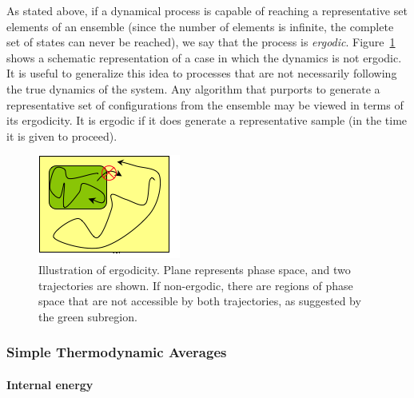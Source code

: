 \documentclass[]{article}
\let\oldparagraph\paragraph
\renewcommand{\paragraph}[1]{\oldparagraph{#1}\mbox{}}
\begin{document}
As stated above, if a dynamical process is capable of reaching a
representative set elements of an ensemble (since the number of elements
is infinite, the complete set of states can never be reached), we say
that the process is \emph{ergodic}. Figure~\ref{fig:ergodicity} shows a schematic
representation of a case in which the dynamics is not ergodic. It is
useful to generalize this idea to processes that are not necessarily
following the true dynamics of the system. Any algorithm that purports
to generate a representative set of configurations from the ensemble may
be viewed in terms of its ergodicity. It is ergodic if it does generate a
representative sample (in the time it is given to proceed).

\begin{figure}
\includegraphics[width=\textwidth]{StatMech_figures/image036}
\caption{\label{fig:ergodicity}Illustration of ergodicity. Plane represents phase space, and two trajectories are shown. If non-ergodic, there are regions of phase space that are not accessible by both trajectories, as suggested by the green subregion.}
\end{figure}


\subsubsection{Simple Thermodynamic
Averages}\label{simple-thermodynamic-averages}

\paragraph{Internal energy}\label{internal-energy}
\end{document}
